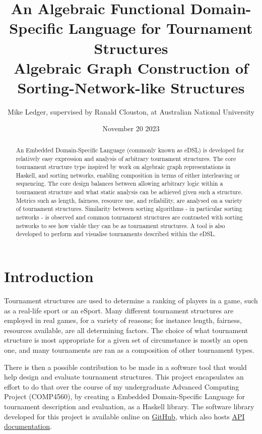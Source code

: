 \documentclass[a4,11pt,twoside,final]{article}
\author{Mike Ledger, supervised by Ranald Clouston, at Australian National University}
\date{November 20 2023}
\title{An Algebraic Functional Domain-Specific Language for Tournament Structures\\\medskip
\large Algebraic Graph Construction of Sorting-Network-like Structures}
\begin{document}
\maketitle
\begin{abstract}
An Embedded Domain-Specific Language (commonly known as eDSL) is developed for
relatively easy expression and analysis of arbitrary tournament structures. The
core tournament structure type inspired by work on algebraic graph
representations in Haskell, and sorting networks, enabling composition in terms
of either interleaving or sequencing. The core design balances between allowing
arbitrary logic within a tournament structure and what static analysis can be
achieved given such a structure. Metrics such as length, fairness, resource use,
and reliability, are analysed on a variety of tournament structures. Similarity
between sorting algorithms - in particular sorting networks - is observed and
common tournament structures are contrasted with sorting networks to see how
viable they can be as tournament structures. A tool is also developed to perform
and visualise tournaments described within the eDSL.
\end{abstract}
\newpage

\begin{multicols}{2}
\setcounter{tocdepth}{2}
\tableofcontents
\end{multicols}

\newpage
{}

\section{Introduction}
\label{sec:orgf54d4f4}

Tournament structures are used to determine a ranking of players in a game, such
as a real-life sport or an eSport. Many different tournament structures are
employed in real games, for a variety of reasons; for instance length, fairness,
resources available, are all determining factors. The choice of what tournament
structure is most appropriate for a given set of circumstance is mostly an open
one, and many tournaments are ran as a composition of other tournament types.

There is then a possible contribution to be made in a software tool that would
help design and evaluate tournament structures. This project encapsulates an
effort to do that over the course of my undergraduate Advanced Computing Project
(COMP4560), by creating a Embedded Domain-Specific Language for tournament
description and evaluation, as a Haskell library. The software library developed
for this project is available online on \href{https://github.com/mikeplus64/journeyman}{GitHub}, which also hosts \href{https://mikeplus64.github.io/journeyman/}{API
documentation}.
\end{document}
